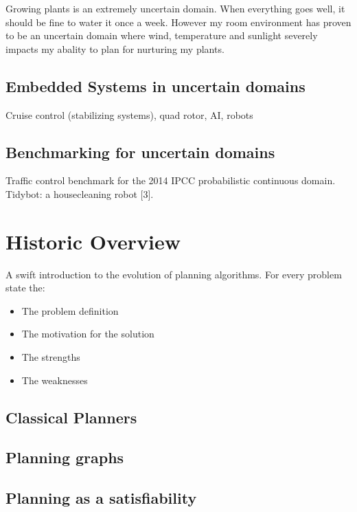 \documentclass[runningheads,a4paper]{llncs}
\begin{document}
Growing plants is an extremely uncertain domain. When everything goes well, it should be fine to water it once a week. However my room environment has proven to be an uncertain domain where wind, temperature and sunlight severely impacts my abality to plan for nurturing my plants.

\subsection{Embedded Systems in uncertain domains}

Cruise control (stabilizing systems), quad rotor, AI, robots

\subsection{Benchmarking for uncertain domains}

Traffic control benchmark for the 2014 IPCC probabilistic continuous domain.
Tidybot: a housecleaning robot [3]. \\


\section{Historic Overview}
A swift introduction to the evolution of planning algorithms. For every problem state the:
\begin{itemize}
	\item The problem definition
	\item The motivation for the solution
	\item The strengths
	\item The weaknesses
\end{itemize}

\subsection{Classical Planners}



\subsection{Planning graphs}

\subsection{Planning as a satisfiability}
\end{document}

